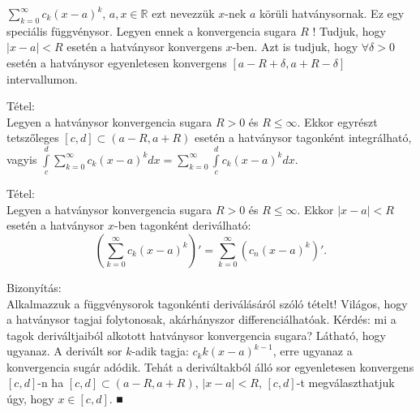 \documentclass[12pt,a4paper]{scrartcl}
\newenvironment{tetel}{}{}
\newenvironment{bizonyitas}{}{}
\begin{document}
\(\sum\limits_{k = 0}^{\infty}{c_{k}\left( {x - a} \right)^{k}}\),
\(a,x \in {\mathbb{R}}\) ezt nevezzük \(x\)-nek \(a\) körüli
hatványsornak. Ez egy speciális függvénysor. Legyen ennek a konvergencia
sugara \(R\) ! Tudjuk, hogy \(\left| {x - a} \right| < R\) esetén a
hatványsor konvergens \(x\)-ben. Azt is tudjuk, hogy
\(\forall\delta > 0\) esetén a hatványsor egyenletesen konvergens
\(\left\lbrack {a - R + \delta,a + R - \delta} \right\rbrack\)
intervallumon.

\begin{tetel}

Tétel:\\
Legyen a hatványsor konvergencia sugara \(R > 0\) és \(R \leq \infty\).
Ekkor egyrészt tetszőleges
\(\left\lbrack {c,d} \right\rbrack \subset \left( {a - R,a + R} \right)\)
esetén a hatványsor tagonként integrálható, vagyis
\({\int\limits_{c}^{d}{{\sum\limits_{k = 0}^{\infty}{c_{k}\left( {x - a} \right)^{k}}}dx}} = {\sum\limits_{k = 0}^{\infty}{\int\limits_{c}^{d}{c_{k}\left( {x - a} \right)^{k}dx}}}\).

\end{tetel}

\begin{tetel}

Tétel:\\
Legyen a hatványsor konvergencia sugara \(R > 0\) és \(R \leq \infty\).
Ekkor \(\left| {x - a} \right| < R\) esetén a hatványsor \(x\)-ben
tagonként deriválható:
\[{\left( {\sum\limits_{k = 0}^{\infty}{c_{k}\left( {x - a} \right)^{k}}} \right)' = {\sum\limits_{k = 0}^{\infty}{\left( {c_{n}\left( {x - a} \right)^{k}} \right)'}}}.\]

\end{tetel}

\begin{bizonyitas}

Bizonyítás:\\
Alkalmazzuk a függvénysorok tagonkénti deriválásáról szóló tételt!
Világos, hogy a hatványsor tagjai folytonosak, akárhányszor
differenciálhatóak. Kérdés: mi a tagok deriváltjaiból alkotott
hatványsor konvergencia sugara? Látható, hogy ugyanaz. A derivált sor
\(k\)-adik tagja: \(c_{k}k\left( {x - a} \right)^{k - 1}\), erre ugyanaz
a konvergencia sugár adódik. Tehát a deriváltakból álló sor egyenletesen
konvergens \(\left\lbrack {c,d} \right\rbrack\)-n ha
\(\left\lbrack {c,d} \right\rbrack \subset \left( {a - R,a + R} \right)\),
\(\left| {x - a} \right| < R\), \(\left\lbrack {c,d} \right\rbrack\)-t
megválaszthatjuk úgy, hogy \(x \in \left\lbrack {c,d} \right\rbrack\). ■

\end{bizonyitas}
\end{document}
